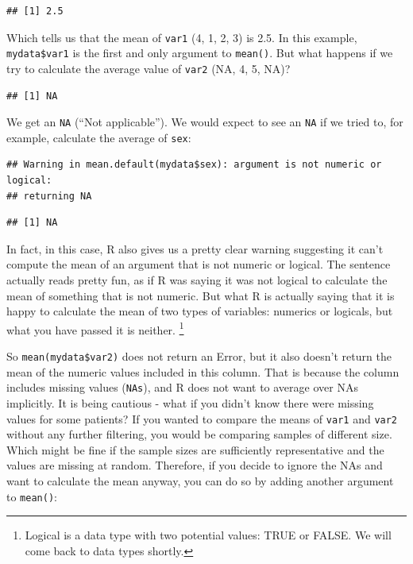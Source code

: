 \documentclass[12pt,]{krantz}
\makeatletter
\newenvironment{Shaded}{\begin{snugshade}}{\end{snugshade}}
\newcommand{\KeywordTok}[1]{\textcolor[rgb]{0.13,0.29,0.53}{\textbf{#1}}}
\newcommand{\NormalTok}[1]{#1}
\newcommand{\OperatorTok}[1]{\textcolor[rgb]{0.81,0.36,0.00}{\textbf{#1}}}
\newenvironment{kframe}{%
\medskip{}
\setlength{\fboxsep}{.8em}
 \def\at@end@of@kframe{}%
 \ifinner\ifhmode%
  \def\at@end@of@kframe{\end{minipage}}%
  \begin{minipage}{\columnwidth}%
 \fi\fi%
 \def\FrameCommand##1{\hskip\@totalleftmargin \hskip-\fboxsep
 \colorbox{shadecolor}{##1}\hskip-\fboxsep
     \hskip-\linewidth \hskip-\@totalleftmargin \hskip\columnwidth}%
 \MakeFramed {\advance\hsize-\width
   \@totalleftmargin\z@ \linewidth\hsize
   \@setminipage}}%
 {\par\unskip\endMakeFramed%
 \at@end@of@kframe}
\renewenvironment{Shaded}{\begin{kframe}}{\end{kframe}}
\theoremstyle{definition}
\theoremstyle{definition}
\theoremstyle{definition}
\theoremstyle{remark}
\makeatother
\begin{document}
\begin{verbatim}
## [1] 2.5
\end{verbatim}

Which tells us that the mean of \texttt{var1} (4, 1, 2, 3) is 2.5. In
this example, \texttt{mydata\$var1} is the first and only argument to
\texttt{mean()}. But what happens if we try to calculate the average
value of \texttt{var2} (NA, 4, 5, NA)?

\begin{Shaded}
\end{Shaded}

\begin{verbatim}
## [1] NA
\end{verbatim}

We get an \texttt{NA} (``Not applicable''). We would expect to see an
\texttt{NA} if we tried to, for example, calculate the average of
\texttt{sex}:

\begin{Shaded}
\end{Shaded}

\begin{verbatim}
## Warning in mean.default(mydata$sex): argument is not numeric or logical:
## returning NA
\end{verbatim}

\begin{verbatim}
## [1] NA
\end{verbatim}

In fact, in this case, R also gives us a pretty clear warning suggesting
it can't compute the mean of an argument that is not numeric or logical.
The sentence actually reads pretty fun, as if R was saying it was not
logical to calculate the mean of something that is not numeric. But what
R is actually saying that it is happy to calculate the mean of two types
of variables: numerics or logicals, but what you have passed it is
neither. \footnote{Logical is a data type with two potential values:
  TRUE or FALSE. We will come back to data types shortly.}

So \texttt{mean(mydata\$var2)} does not return an Error, but it also
doesn't return the mean of the numeric values included in this column.
That is because the column includes missing values (\texttt{NAs}), and R
does not want to average over NAs implicitly. It is being cautious -
what if you didn't know there were missing values for some patients? If
you wanted to compare the means of \texttt{var1} and \texttt{var2}
without any further filtering, you would be comparing samples of
different size. Which might be fine if the sample sizes are sufficiently
representative and the values are missing at random. Therefore, if you
decide to ignore the NAs and want to calculate the mean anyway, you can
do so by adding another argument to \texttt{mean()}:
\end{document}
